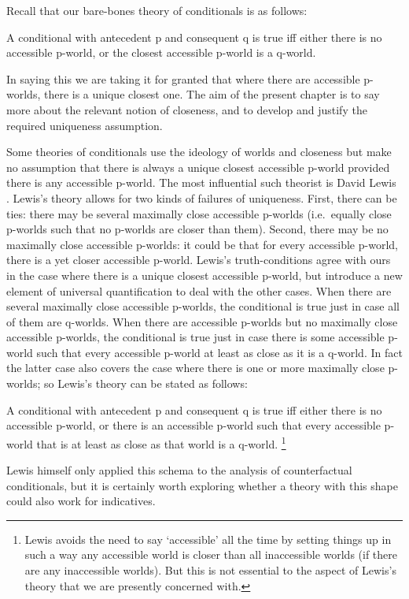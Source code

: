 \documentclass[leqno, 11pt, a5paper, openany]{article}
\begin{document}
Recall that our bare-bones theory of conditionals is as follows:
\begin{prop}
\litem[CLOSEST] \label{closest}
	A conditional with antecedent p and consequent q is true iff either there is no accessible p-world, or the closest accessible p-world is a q-world.
\end{prop}
In saying this we are taking it for granted that where there are accessible p-worlds, there is a unique closest one. The aim of the present chapter is to say more about the relevant notion of closeness, and to develop and justify the required uniqueness assumption.

Some theories of conditionals use the ideology of worlds and closeness but make no assumption that there is always a unique closest accessible p-world provided there is any accessible p-world. The most influential such theorist is David Lewis \citeyearpar{LewisCounterfactuals}. Lewis's theory allows for two kinds of failures of uniqueness. First, there can be ties: there may be several maximally close accessible p-worlds (i.e.\ equally close p-worlds such that no p-worlds are closer than them). Second, there may be no maximally close accessible p-worlds: it could be that for every accessible p-world, there is a yet closer accessible p-world. Lewis's truth-conditions agree with ours in the case where there is a unique closest accessible p-world, but introduce a new element of universal quantification to deal with the other cases. When there are several maximally close accessible p-worlds, the conditional is true just in case all of them are q-worlds. When there are accessible p-worlds but no maximally close accessible p-worlds, the conditional is true just in case there is some accessible p-world such that every accessible p-world at least as close as it is a q-world. In fact the latter case also covers the case where there is one or more maximally close p-worlds; so Lewis's theory can be stated as follows:
\begin{prop}
\litem[LEWIS] \label{lewis}
	A conditional with antecedent p and consequent q is true iff either there is no accessible p-world, or there is an accessible p-world such that every accessible p-world that is at least as close as that world is a q-world.%
	\footnote{Lewis avoids the need to say ‘accessible’ all the time by setting things up in such a way any accessible world is closer than all inaccessible worlds (if there are any inaccessible worlds). But this is not essential to the aspect of Lewis's theory that we are presently concerned with.} 
\end{prop}
Lewis himself only applied this schema to the analysis of counterfactual conditionals, but it is certainly worth exploring whether a theory with this shape could also work for indicatives.
\end{document}
